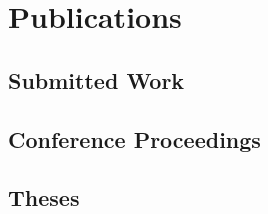 \section{Publications}
\subsection{Submitted Work}
\subsection{Conference Proceedings}
\subsection{Theses}